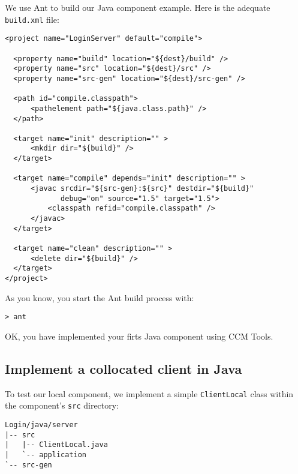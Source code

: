 We use Ant to build our Java component example. Here is the adequate
{\tt build.xml} file:
\begin{footnotesize}
\begin{verbatim}
<project name="LoginServer" default="compile">

  <property name="build" location="${dest}/build" />
  <property name="src" location="${dest}/src" />
  <property name="src-gen" location="${dest}/src-gen" />

  <path id="compile.classpath">
      <pathelement path="${java.class.path}" />
  </path>

  <target name="init" description="" >
      <mkdir dir="${build}" />
  </target>
 
  <target name="compile" depends="init" description="" >
      <javac srcdir="${src-gen}:${src}" destdir="${build}" 
             debug="on" source="1.5" target="1.5">
          <classpath refid="compile.classpath" />  
      </javac>
  </target>

  <target name="clean" description="" >
      <delete dir="${build}" />
  </target>
</project>
\end{verbatim}
\end{footnotesize}

As you know, you start the Ant build process with:
\begin{footnotesize}
\begin{verbatim}
> ant
\end{verbatim}
\end{footnotesize}

OK, you have implemented your firts Java component using CCM Tools.


\subsection{Implement a collocated client in Java}
\label{subsection:ImplementLocalComponentClient}

To test our local component, we implement a simple {\tt ClientLocal} class
within the component's {\tt src} directory:
\begin{footnotesize}
\begin{verbatim}
Login/java/server
|-- src
|   |-- ClientLocal.java
|   `-- application
`-- src-gen
\end{verbatim}
\end{footnotesize}

